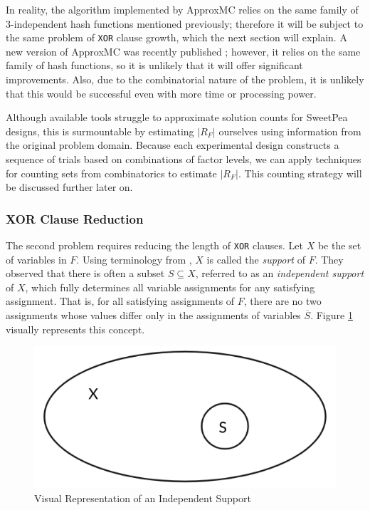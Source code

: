 In reality, the algorithm implemented by ApproxMC relies on the same family of 3-independent hash functions mentioned previously; therefore it will be subject to the same problem of \texttt{XOR} clause growth, which the next section will explain. A new version of ApproxMC was recently published \cite{approxmc_SM19}; however, it relies on the same family of hash functions, so it is unlikely that it will offer significant improvements. Also, due to the combinatorial nature of the problem, it is unlikely that this would be successful even with more time or processing power.

Although available tools struggle to approximate solution counts for SweetPea designs, this is surmountable by estimating $|R_F|$ ourselves using information from the original problem domain. Because each experimental design constructs a sequence of trials based on combinations of factor levels, we can apply techniques for counting sets from combinatorics to estimate $|R_F|$. This counting strategy will be discussed further later on.

\subsubsection{XOR Clause Reduction}

The second problem requires reducing the length of \texttt{XOR} clauses. Let $X$ be the set of variables in $F$. Using terminology from \cite{chakraborty_balancing_2014}, $X$ is called the \textit{support} of $F$. They observed that there is often a subset $S \subseteq X$, referred to as an \textit{independent support} of $X$, which fully determines all variable assignments for any satisfying assignment. That is, for all satisfying assignments of $F$, there are no two assignments whose values differ only in the assignments of variables $\overline{S}$. Figure \ref{fig:ind_support} visually represents this concept.

\begin{figure}[htb]
\centering
\centerline{\includegraphics[origin=c,width=12cm]{../figures/independent-support.png}}
\caption{Visual Representation of an Independent Support}
\label{fig:ind_support}
\end{figure}

